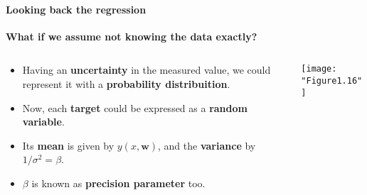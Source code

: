 \begin{frame}{\insertsubsection}
	\framesubtitle{Looking back the regression}
	\textcolor{UniGold}{\textbf{What if we assume not knowing the data exactly?}}
	\begin{columns}
	\begin{column}{0.475\textwidth}
		\begin{itemize}
			\item Having an \textcolor{UniOrange}{\textbf{uncertainty}} in the measured value, we could represent it with a \textcolor{UniOrange}{\textbf{probability distribuition}}.
			\item Now, each \textcolor{UniOrange}{\textbf{target}} could be expressed as a \textcolor{UniOrange}{\textbf{random variable}}.
			\item Its \textcolor{UniOrange}{\textbf{mean}} is given by $y(x,\mathbf{w})$, and the \textcolor{UniOrange}{\textbf{variance}} by $1/\sigma^2 = \beta$.
			\item $\beta$ is known as \textcolor{UniOrange}{\textbf{precision parameter}} too.
		\end{itemize}
		\end{column}
		\begin{column}{0.475\textwidth}  %
			\begin{center}
				\texttt{[image: "Figure1.16"]}
			\end{center}
		\end{column}
	\end{columns}
\end{frame}


